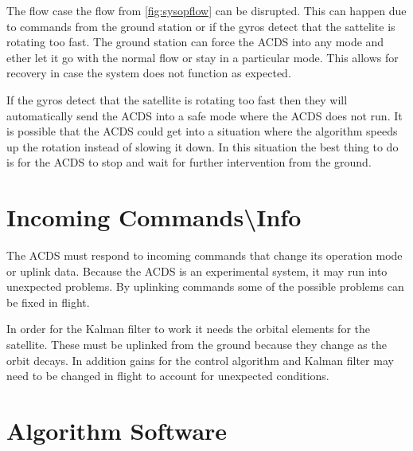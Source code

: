 The flow case the flow from \cref{fig:sysopflow} can be disrupted. This can happen due to commands from the ground station or if the gyros detect that the sattelite is rotating too fast. The ground station can force the \ac{ACDS} into any mode and ether let it go with the normal flow or stay in a particular mode. This allows for recovery in case the system does not function as expected.

If the gyros detect that the satellite is rotating too fast then they will automatically send the \ac{ACDS} into a safe mode where the \ac{ACDS} does not run. It is possible that the \ac{ACDS} could get into a situation where the algorithm speeds up the rotation instead of slowing it down. In this situation the best thing to do is for the \ac{ACDS} to stop and wait for further intervention from the ground.

\section{Incoming Commands\textbackslash Info}

The \ac{ACDS} must respond to incoming commands that change its operation mode or uplink data. Because the \ac{ACDS} is an experimental system, it may run into unexpected problems. By uplinking commands some of the possible problems can be fixed in flight. 

In order for the Kalman filter to work it needs the orbital elements for the satellite. These must be uplinked from the ground because they change as the orbit decays. In addition gains for the control algorithm and Kalman filter may need to be changed in flight to account for unexpected conditions. 

\begin{comment}
\begin{itemize}
    \item Ground Station Commands
        \begin{itemize}
            \item Uplink Orbit Data
            \item Stop \ac{ACDS}
            \item Force Mode
        \end{itemize}
    \item Sensor Data
\end{itemize}
\end{comment}

\section{Algorithm Software}

